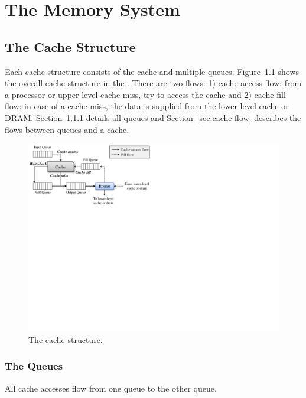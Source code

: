 

\chapter{The Memory System}
\label{sec:memory}

\section{The Cache Structure}

Each cache structure consists of the cache and multiple
queues. Figure~\ref{fig:cache} shows the overall cache structure in
the \SIM. There are two flows: 1) cache access flow: from a processor
or upper level cache miss, try to access the cache and 2) cache fill
flow: in case of a cache miss, the data is supplied from the lower
level cache or DRAM. Section~\ref{sec:queue} details all queues and
Section~\ref{sec:cache-flow} describes the flows between queues and a
cache.

\begin{figure}[htb]
\centering
\includegraphics{figs/cache}
\caption{The cache structure.}
\label{fig:cache}
\end{figure}


\subsection{The Queues}
\label{sec:queue}

All cache accesses flow from one queue to the other queue. 

